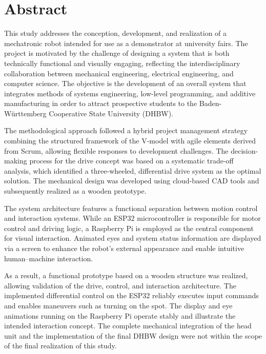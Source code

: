 \clearpage

\chapter*{Abstract} %
This study addresses the conception, development, and realization of a mechatronic robot intended for use as a demonstrator at university fairs. The project is motivated by the challenge of designing a system that is both technically functional and visually engaging, reflecting the interdisciplinary collaboration between mechanical engineering, electrical engineering, and computer science. The objective is the development of an overall system that integrates methods of systems engineering, low-level programming, and additive manufacturing in order to attract prospective students to the Baden-Württemberg Cooperative State University (DHBW).

The methodological approach followed a hybrid project management strategy combining the structured framework of the V-model with agile elements derived from Scrum, allowing flexible responses to development challenges. The decision-making process for the drive concept was based on a systematic trade-off analysis, which identified a three-wheeled, differential drive system as the optimal solution. The mechanical design was developed using cloud-based CAD tools and subsequently realized as a wooden prototype.

The system architecture features a functional separation between motion control and interaction systems. While an ESP32 microcontroller is responsible for motor control and driving logic, a Raspberry Pi is employed as the central component for visual interaction. Animated eyes and system status information are displayed via a screen to enhance the robot’s external appearance and enable intuitive human–machine interaction.

As a result, a functional prototype based on a wooden structure was realized, allowing validation of the drive, control, and interaction architecture. The implemented differential control on the ESP32 reliably executes input commands and enables maneuvers such as turning on the spot. The display and eye animations running on the Raspberry Pi operate stably and illustrate the intended interaction concept. The complete mechanical integration of the head unit and the implementation of the final DHBW design were not within the scope of the final realization of this study.

\clearpage